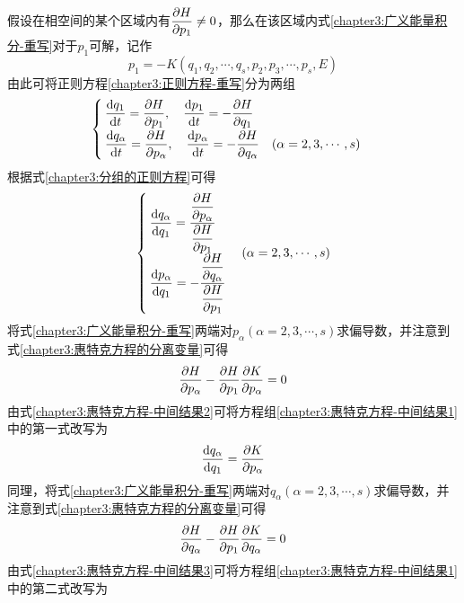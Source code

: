 假设在相空间的某个区域内有$\dfrac{\partial H}{\partial p_1}\neq 0$，那么在该区域内式\eqref{chapter3:广义能量积分-重写}对于$p_1$可解，记作
\begin{equation}
	p_1 = -K(q_1,q_2,\cdots,q_s,p_2,p_3,\cdots,p_s,E)
	\label{chapter3:惠特克方程的分离变量}
\end{equation}
由此可将正则方程\eqref{chapter3:正则方程-重写}分为两组
\begin{equation}
\begin{cases}
	\displaystyle \frac{\mathrm{d} q_1}{\mathrm{d} t} = \frac{\partial H}{\partial p_1},\quad \frac{\mathrm{d} p_1}{\mathrm{d} t} = -\frac{\partial H}{\partial q_1} \\[1.5ex]
	\displaystyle \frac{\mathrm{d} q_\alpha}{\mathrm{d} t} = \frac{\partial H}{\partial p_\alpha},\quad \frac{\mathrm{d} p_\alpha}{\mathrm{d} t} = -\frac{\partial H}{\partial q_\alpha}\quad (\alpha=2,3,\cdots,s)
\end{cases}
\label{chapter3:分组的正则方程}
\end{equation}
根据式\eqref{chapter3:分组的正则方程}可得
\begin{equation}
\begin{cases}
	\displaystyle \frac{\mathrm{d} q_\alpha}{\mathrm{d} q_1} = \frac{\dfrac{\partial H}{\partial p_\alpha}}{\dfrac{\partial H}{\partial p_1}} \\[3.0ex]
	\displaystyle \frac{\mathrm{d} p_\alpha}{\mathrm{d} q_1} = -\frac{\dfrac{\partial H}{\partial q_\alpha}}{\dfrac{\partial H}{\partial p_1}} 
\end{cases}
(\alpha = 2,3,\cdots,s)
\label{chapter3:惠特克方程-中间结果1}
\end{equation}
将式\eqref{chapter3:广义能量积分-重写}两端对$p_\alpha(\alpha=2,3,\cdots,s)$求偏导数，并注意到式\eqref{chapter3:惠特克方程的分离变量}可得
\begin{equation}
	\frac{\partial H}{\partial p_\alpha}-\frac{\partial H}{\partial p_1}\frac{\partial K}{\partial p_\alpha} = 0
	\label{chapter3:惠特克方程-中间结果2}
\end{equation}
由式\eqref{chapter3:惠特克方程-中间结果2}可将方程组\eqref{chapter3:惠特克方程-中间结果1}中的第一式改写为
\begin{equation*}
	\frac{\mathrm{d} q_\alpha}{\mathrm{d} q_1} = \frac{\partial K}{\partial p_\alpha}
\end{equation*}
同理，将式\eqref{chapter3:广义能量积分-重写}两端对$q_\alpha(\alpha=2,3,\cdots,s)$求偏导数，并注意到式\eqref{chapter3:惠特克方程的分离变量}可得
\begin{equation}
	\frac{\partial H}{\partial q_\alpha}-\frac{\partial H}{\partial p_1}\frac{\partial K}{\partial q_\alpha} = 0
	\label{chapter3:惠特克方程-中间结果3}
\end{equation}
由式\eqref{chapter3:惠特克方程-中间结果3}可将方程组\eqref{chapter3:惠特克方程-中间结果1}中的第二式改写为
